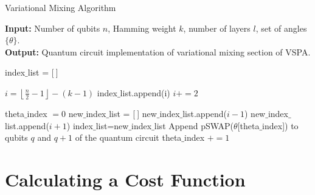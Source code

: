 \documentclass[Dual]{msu-thesis}
\begin{document}
\begin{algorithm}[H]

\caption{Variational Mixing Algorithm}\label{lphsn}

\hspace*{\algorithmicindent} \textbf{Input:} Number of qubits $n$, Hamming weight $k$, number of layers $l$, set of angles $\{\theta\}$.
\\
\hspace*{\algorithmicindent} \textbf{Output:} Quantum circuit implementation of variational mixing section of VSPA.

\begin{algorithmic}[H]

\State index$\_$list = [$\ $]

\State 

\State $i=\left\lfloor\frac{n}{2}-1\right\rfloor - (k-1)$
    \State index$\_$list.append(i)
    \State $i+=2$
\EndWhile

\State 

\State theta$\_$index $= 0$
        new$\_$index$\_$list = [$\ $]
            \State new$\_$index$\_$list.append($i-1$)
        \EndFor
        \State new$\_$index$\_$list.append($i+1$)
        \State index$\_$list=new$\_$index$\_$list
    \EndIf
            \State Append pSWAP($\theta$[theta$\_$index]) to qubits $q$ and $q+1$ of the quantum circuit
            \State theta$\_$index $+=1$
        \EndIf
    \EndFor
\EndFor

\end{algorithmic}

\end{algorithm}

\section{Calculating a Cost Function}
\end{document}
